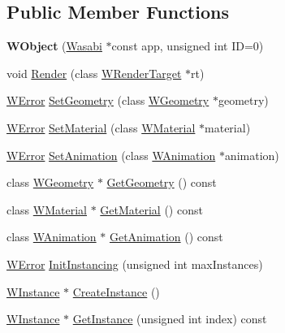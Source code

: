 \subsection*{Public Member Functions}
\begin{DoxyCompactItemize}
\item 
{\bfseries W\+Object} (\hyperlink{class_wasabi}{Wasabi} $\ast$const app, unsigned int ID=0)\hypertarget{class_w_object_ae01d22761e4282b9f3d3ebf23d64f4b8}{}\label{class_w_object_ae01d22761e4282b9f3d3ebf23d64f4b8}

\item 
void \hyperlink{class_w_object_a315a4d624c6e6c5fef996e1dd87abe33}{Render} (class \hyperlink{class_w_render_target}{W\+Render\+Target} $\ast$rt)
\item 
\hyperlink{class_w_error}{W\+Error} \hyperlink{class_w_object_a473a8002f7bb6581ecb38937ff1df10e}{Set\+Geometry} (class \hyperlink{class_w_geometry}{W\+Geometry} $\ast$geometry)
\item 
\hyperlink{class_w_error}{W\+Error} \hyperlink{class_w_object_add4eb131afa0b55fbb4d5695eee7569c}{Set\+Material} (class \hyperlink{class_w_material}{W\+Material} $\ast$material)
\item 
\hyperlink{class_w_error}{W\+Error} \hyperlink{class_w_object_aa78d1b389d67bc5a9ee9fd64d559e64a}{Set\+Animation} (class \hyperlink{class_w_animation}{W\+Animation} $\ast$animation)
\item 
class \hyperlink{class_w_geometry}{W\+Geometry} $\ast$ \hyperlink{class_w_object_a21ff26282c4c6e76b9e93749a53e8a67}{Get\+Geometry} () const 
\item 
class \hyperlink{class_w_material}{W\+Material} $\ast$ \hyperlink{class_w_object_a4832d77d13177c26165833be034db5b3}{Get\+Material} () const 
\item 
class \hyperlink{class_w_animation}{W\+Animation} $\ast$ \hyperlink{class_w_object_a1fd40c0623b666c46a5d5a4508dec979}{Get\+Animation} () const 
\item 
\hyperlink{class_w_error}{W\+Error} \hyperlink{class_w_object_a3eb6c8b80c1cc3ca3149be1647f3abb4}{Init\+Instancing} (unsigned int max\+Instances)
\item 
\hyperlink{class_w_instance}{W\+Instance} $\ast$ \hyperlink{class_w_object_acb0daac5850075a54b012703bab0b589}{Create\+Instance} ()
\item 
\hyperlink{class_w_instance}{W\+Instance} $\ast$ \hyperlink{class_w_object_a144ebe9b2effa5355d3e5c243d871ced}{Get\+Instance} (unsigned int index) const 
\item 

\end{DoxyCompactItemize}
